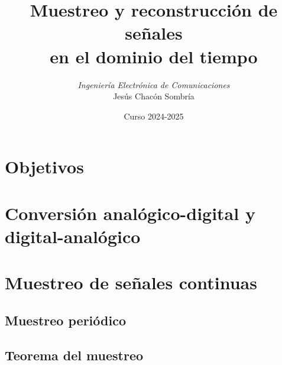 \documentclass[handout]{beamer}
\title[Procesamiento de Señales]{Muestreo y reconstrucción de señales \\ en el dominio del tiempo}
\author[Jesús Chacón] {%
	\textit{Ingeniería Electrónica de Comunicaciones}\\
	\vspace{0.6cm}
	\small Jesús Chacón Sombría%
}%
\institute[DACYA] {%
	\footnotesize  Departamento de Arquitectura de Computadores y Automática\\
  Universidad Complutense de Madrid
}
\date[Muestreo y reconstrucción] %
{\footnotesize Curso 2024-2025}%
\newcommand{\MyLogo}{%
\begin{textblock}{14}(116.0,0.6)
  \pgfuseimage{logo}
\end{textblock}
}
\numberwithin{section}{part}
\begin{document}
\begin{frame}
  \titlepage
\end{frame}

\newcommand*\oldmacro{}%
\let\oldmacro\insertshorttitle%
\renewcommand*\insertshorttitle{%
 \MyLogo
  \oldmacro\hfill%
}

\AtBeginSection[]{}
\AtBeginSubsection[]{}

\section{Objetivos}
\section{Conversión analógico-digital y digital-analógico}
\section{Muestreo de señales continuas}
\subsection{Muestreo periódico}
\subsection{Teorema del muestreo}
  
\end{document}
